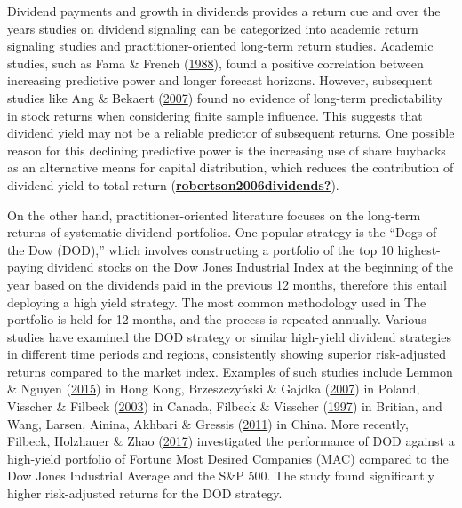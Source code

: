 \documentclass[11pt,preprint, authoryear]{elsarticle}
\numberwithin{equation}{section}
\numberwithin{figure}{section}
\numberwithin{table}{section}
\begin{document}
Dividend payments and growth in dividends provides a return cue and over
the years studies on dividend signaling can be categorized into academic
return signaling studies and practitioner-oriented long-term return
studies. Academic studies, such as Fama \& French
(\protect\hyperlink{ref-fama1988permanent}{1988}), found a positive
correlation between increasing predictive power and longer forecast
horizons. However, subsequent studies like Ang \& Bekaert
(\protect\hyperlink{ref-ang2007stock}{2007}) found no evidence of
long-term predictability in stock returns when considering finite sample
influence. This suggests that dividend yield may not be a reliable
predictor of subsequent returns. One possible reason for this declining
predictive power is the increasing use of share buybacks as an
alternative means for capital distribution, which reduces the
contribution of dividend yield to total return
(\protect\hyperlink{ref-robertson2006dividends}{\textbf{robertson2006dividends?}}).

On the other hand, practitioner-oriented literature focuses on the
long-term returns of systematic dividend portfolios. One popular
strategy is the ``Dogs of the Dow (DOD),'' which involves constructing a
portfolio of the top 10 highest-paying dividend stocks on the Dow Jones
Industrial Index at the beginning of the year based on the dividends
paid in the previous 12 months, therefore this entail deploying a high
yield strategy. The most common methodology used in The portfolio is
held for 12 months, and the process is repeated annually. Various
studies have examined the DOD strategy or similar high-yield dividend
strategies in different time periods and regions, consistently showing
superior risk-adjusted returns compared to the market index. Examples of
such studies include Lemmon \& Nguyen
(\protect\hyperlink{ref-lemmon2015dividend}{2015}) in Hong Kong,
Brzeszczyński \& Gajdka
(\protect\hyperlink{ref-brzeszczynski2007dividend}{2007}) in Poland,
Visscher \& Filbeck (\protect\hyperlink{ref-visscher2003dividend}{2003})
in Canada, Filbeck \& Visscher
(\protect\hyperlink{ref-filbeck1997}{1997}) in Britian, and Wang,
Larsen, Ainina, Akhbari \& Gressis
(\protect\hyperlink{ref-wang2011dogs}{2011}) in China. More recently,
Filbeck, Holzhauer \& Zhao
(\protect\hyperlink{ref-filbeck2017dividend}{2017}) investigated the
performance of DOD against a high-yield portfolio of Fortune Most
Desired Companies (MAC) compared to the Dow Jones Industrial Average and
the S\&P 500. The study found significantly higher risk-adjusted returns
for the DOD strategy.
\end{document}
